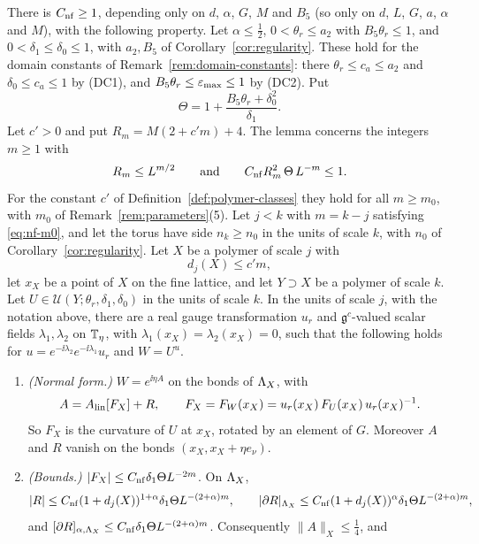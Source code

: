 \begin{lemma}\label{lem:later-normal-form}
There is $C_{\rm nf}\ge1$, depending only on $d$, $\alpha$, $G$, $M$ and $B_5$ (so only on $d$, $L$, $G$, $a$, $\alpha$ and $M$), with the following property. Let $\alpha\le\frac12$, $0<\theta_r\le a_2$ with $B_5\theta_r\le1$, and $0<\delta_1\le\delta_0\le1$, with $a_2,B_5$ of Corollary~\ref{cor:regularity}. These hold for the domain constants of Remark~\ref{rem:domain-constants}: there $\theta_r\le c_a\le a_2$ and $\delta_0\le c_a\le1$ by (DC1), and $B_5\theta_r\le\varepsilon_{\max}\le1$ by (DC2). Put
\[
\Theta=1+\frac{B_5\theta_r+\delta_0^2}{\delta_1}.
\]
Let $c'>0$ and put $R_m=M(2+c'm)+4$. The lemma concerns the integers $m\ge1$ with
\begin{equation}\label{eq:nf-m0}
R_m\le L^{m/2}\qquad\text{and}\qquad C_{\rm nf}R_m^2\,\Theta\,L^{-m}\le1 .
\end{equation}
For the constant $c'$ of Definition~\ref{def:polymer-classes} they hold for all $m\ge m_0$, with $m_0$ of Remark~\ref{rem:parameters}(5). Let $j<k$ with $m=k-j$ satisfying \eqref{eq:nf-m0}, and let the torus have side $n_k\ge n_0$ in the units of scale $k$, with $n_0$ of Corollary~\ref{cor:regularity}. Let $X$ be a polymer of scale $j$ with
\[
d_j(X)\le c'm ,
\]
let $x_X$ be a point of $X$ on the fine lattice, and let $Y\supset X$ be a polymer of scale $k$. Let $U\in\mathcal U(Y;\theta_r,\delta_1,\delta_0)$ in the units of scale $k$. In the units of scale $j$, with the notation above, there are a real gauge transformation $u_r$ and $\mathfrak g^c$-valued scalar fields $\lambda_1,\lambda_2$ on $\mathbb T_\eta$, with $\lambda_1(x_X)=\lambda_2(x_X)=0$, such that the following holds for $u=e^{-\ii\lambda_2}e^{-\ii\lambda_1}u_r$ and $W=U^u$.
\begin{enumerate}[label=(\alph*)]
\item \emph{(Normal form.)} $W=e^{\ii\eta A}$ on the bonds of $\Lambda_X$, with
\[
A=A_{\rm lin}[F_X]+R,\qquad F_X=F_W(x_X)=u_r(x_X)\,F_U(x_X)\,u_r(x_X)^{-1}.
\]
So $F_X$ is the curvature of $U$ at $x_X$, rotated by an element of $G$. Moreover $A$ and $R$ vanish on the bonds $(x_X,x_X+\eta e_\nu)$.
\item \emph{(Bounds.)} $|F_X|\le C_{\rm nf}\delta_1\Theta L^{-2m}$. On $\Lambda_X$,
\[
|R|\le C_{\rm nf}(1+d_j(X))^{1+\alpha}\delta_1\Theta L^{-(2+\alpha)m},\qquad|\partial R|_{\Lambda_X}\le C_{\rm nf}(1+d_j(X))^\alpha\delta_1\Theta L^{-(2+\alpha)m},
\]
and $[\partial R]_{\alpha,\Lambda_X}\le C_{\rm nf}\delta_1\Theta L^{-(2+\alpha)m}$. Consequently $\|A\|_X\le\frac14$, and

\end{enumerate}
\end{lemma}

